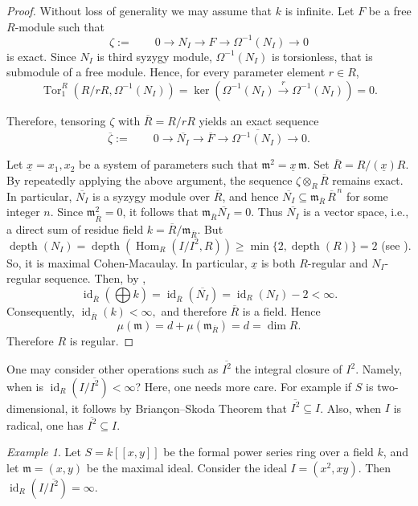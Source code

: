 \documentclass[10. pt,a4paper]{amsart}
\theoremstyle{definition}
\theoremstyle{remark}
\newtheorem{example}[theorem]{Example}
\newcommand{\id}{\operatorname{id}}
\newcommand{\Tor}{\operatorname{Tor}}
\newcommand{\Hom}{\operatorname{Hom}}
\newcommand{\depth}{\operatorname{depth}}
\begin{document}
\begin{proof}Without loss of generality we may assume that $k$ is infinite. 
Let $F$ be a free $R$-module such that
\[
\zeta:=\qquad
0 \longrightarrow N_I
\longrightarrow F
\longrightarrow \Omega^{-1}(N_I)
\longrightarrow 0
\]
is exact. 
Since $N_I$ is  third syzygy module, $\Omega^{-1}(N_I)$ is torsionless, that is submodule of a free module. Hence, for every parameter element $r\in R$,
\[
\Tor_1^R(R/rR,\Omega^{-1}(N_I))
=
\ker\!\left(
\Omega^{-1}(N_I)
\xrightarrow{\;r\;}
\Omega^{-1}(N_I)
\right)
=0.
\]

Therefore, tensoring $\zeta$ with $\overline{R}=R/rR$ yields an exact sequence
\[
\overline{\zeta}:=\qquad
0\longrightarrow
\overline{N_I}
\longrightarrow
\overline{F}
\longrightarrow
\overline{\Omega^{-1}(N_I)}
\longrightarrow 0.
\]

Let $\underline{x}=x_1, x_2$ be a system of parameters such that
\(
\mathfrak m^2=\underline{x}\,\mathfrak m.
\)
Set
\(
\overline{R}=R/(\underline{x})R.
\)
By repeatedly applying the above argument, the sequence
\(
\zeta\otimes_R \overline{R}
\)
remains exact.
In particular, $\overline{N_I}$ is a syzygy module over $\overline{R}$, and hence
\(
\overline{N_I}\subseteq
\mathfrak m_{\overline{R}}\,
\overline{R}^{\,n}
\)
for some integer $n$. Since $\mathfrak m_{\overline{R}}^2=0$, it follows that
\(
\mathfrak m_{\overline{R}}\overline{N_I}=0.
\)
Thus $\overline{N_I}$ is a vector space, i.e., a 
direct sum of residue field
\(
k=\overline{R}/\mathfrak m_{\overline{R}}.
	\) But $\depth(N_I)=\depth(\Hom_R(I/I^2,R)) \geq \min\{2,\depth(R)\} =2$ (see \cite[1.4.19]{BH}). So, it is maximal Cohen-Macaulay. In particular, $\underline{x}$ is both $R$-regular and $N_I$-regular sequence.
Then, by \cite[Proposition 3.1.15]{BH},
\[
\id_{\overline{R}}
\!\left(
\bigoplus k
\right)=\id_{\overline{R}}(\overline{N_I})
=
\id_R(N_I)-2
<\infty.
\]
Consequently,
\(
\id_{\overline{R}}(k)<\infty,
\)
and therefore $\overline{R}$ is a field.
Hence
\[
\mu(\mathfrak m)
=
d+\mu(\mathfrak m_{\overline{R}})
=
d
=
\dim R.
\]
Therefore $R$ is regular.
\end{proof}

One may consider other operations such as $\overline{I^{2}}$ the integral closure of $I^{2}$. Namely,  when is $\id_R(I/\overline{I^{2}}) < \infty$? Here, one needs more care. For example if $S$ is two-dimensional, it follows by Brian\c{c}on--Skoda Theorem that $\overline{I^{2}} \subseteq I$. Also, when $I$ is radical, one has 
$\overline{I^{2}} \subseteq I$.
\begin{example}
Let $S = k[[x,y]]$ be the formal power series ring over a field $k$, and let $\mathfrak{m} = (x,y)$ be the maximal ideal. Consider the ideal $I = (x^2, xy)$.
Then
$\id_R(I/\overline{I^{2}}) = \infty$.
\end{example}
\end{document}
